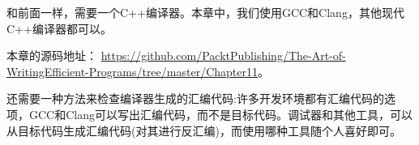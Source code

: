 和前面一样，需要一个C++编译器。本章中，我们使用GCC和Clang，其他现代C++编译器都可以。 

本章的源码地址： \url{https://github.com/PacktPublishing/The-Art-of-WritingEfficient-Programs/tree/master/Chapter11}。

还需要一种方法来检查编译器生成的汇编代码:许多开发环境都有汇编代码的选项，GCC和Clang可以写出汇编代码，而不是目标代码。调试器和其他工具，可以从目标代码生成汇编代码(对其进行反汇编)，而使用哪种工具随个人喜好即可。